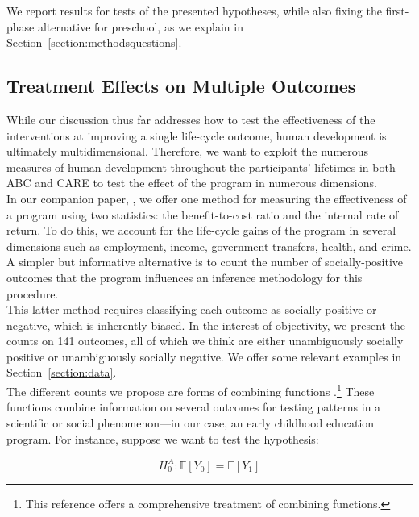 \noindent We report results for tests of the presented hypotheses, while also fixing the first-phase alternative for preschool, as we explain in Section~\ref{section:methodsquestions}.

\subsection{Treatment Effects on Multiple Outcomes} \label{section:counts}

\noindent While our discussion thus far addresses how to test the effectiveness of the interventions at improving a single life-cycle outcome, human development is ultimately multidimensional. Therefore, we want to exploit the numerous measures of human development throughout the participants' lifetimes in both ABC and CARE to test the effect of the program in numerous dimensions. \\

\noindent In our companion paper, \citet{Elango_et_al_2015_ABC_unpublished}, we offer one method for measuring the effectiveness of a program using two statistics: the benefit-to-cost ratio and the internal rate of return. To do this, we account for the life-cycle gains of the program in several dimensions such as employment, income, government transfers, health, and crime. A simpler but informative alternative is to count the number of socially-positive outcomes that the program influences an inference methodology for this procedure.\\

\noindent This latter method requires classifying each outcome as socially positive or negative, which is inherently biased. In the interest of objectivity, we present the counts on 141 outcomes, all of which we think are either unambiguously socially positive or unambiguously socially negative. We offer some relevant examples in Section~\ref{section:data}.\\

\noindent The different counts we propose are forms of combining functions \citep{Pesarin_Salmaso_2010_PermutationTests}.\footnote{This reference offers a comprehensive treatment of combining functions.} These functions combine information on several outcomes for testing patterns in a scientific or social phenomenon---in our case, an early childhood education program. For instance, suppose we want to test the hypothesis: 

\begin{equation}
H_{0}^A: \mathbb{E} \left[ Y_{0} \right] =  \mathbb{E} \left[ Y_{1} \right] \label{eq:hoagain}
\end{equation}


